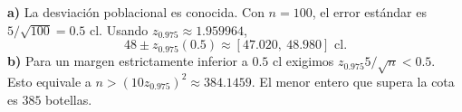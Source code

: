 \textbf{a)} La desviación poblacional es conocida.
Con $n=100$, el error estándar es $5/\sqrt{100}=0.5$ cl.
Usando $z_{0.975}\approx1.959964$,
\[
48\pm z_{0.975}(0.5)\approx\boxed{[47.020,\ 48.980]\text{ cl}}.
\]
\textbf{b)} Para un margen estrictamente inferior a $0.5$ cl
exigimos $z_{0.975}5/\sqrt n<0.5$. Esto equivale a
$n>(10z_{0.975})^2\approx384.1459$. El menor entero
que supera la cota es $\boxed{385}$ botellas.
